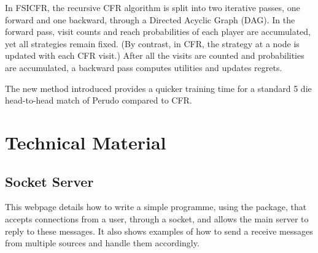 In FSICFR, the recursive CFR algorithm is split into two iterative passes, one forward and one backward, through a Directed Acyclic Graph (DAG). In the forward pass, visit counts and reach probabilities of each player are accumulated, yet all strategies remain fixed. (By contrast, in CFR, the strategy at a node is updated with each CFR visit.) After all the visits are counted and probabilities are accumulated, a backward pass computes utilities and updates regrets.

The new method introduced provides a quicker training time for a standard 5 die head-to-head match of Perudo compared to CFR.

\section{Technical Material}

\subsection{Socket Server}

This webpage \autocite{NathanJennings} details how to write a simple programme, using the  package, that accepts connections from a user, through a socket, and allows the main server to reply to these messages. It also shows examples of how to send a receive messages from multiple sources and handle them accordingly.
